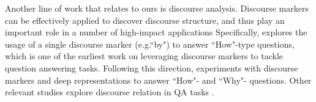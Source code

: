 

Another line of work that relates to ours is discourse analysis. Discourse markers can be effectively applied to discover discourse structure, and thus play an important role in a number of high-impact applications %
Specifically, \cite{DBLP:conf/sigir/PragerBCR00} explores the usage of a single discourse marker (e.g.``by") to answer ``How"-type questions, which is one of the earliest work on leveraging discourse markers to tackle question answering tasks. Following this direction, \cite{DBLP:conf/acl/JansenSC14} experiments with discourse markers and deep representations to answer ``How"- and ``Why"- questions. %
Other relevant studies explore discourse relation in QA tasks \cite{DBLP:journals/tal/VerberneBCO06,DBLP:journals/ir/VerberneHTRB11,DBLP:conf/acl/NarasimhanB15}. %
